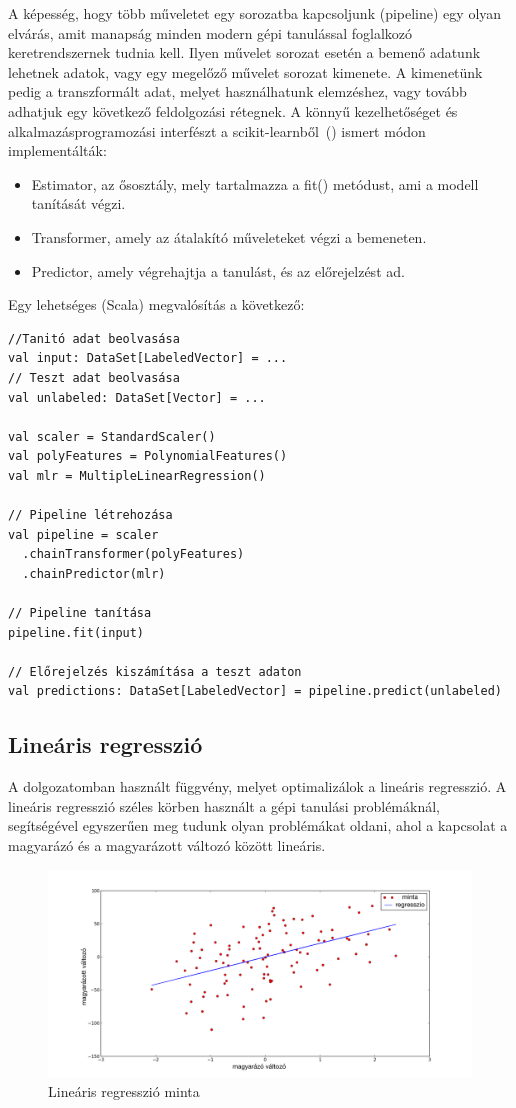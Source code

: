 \documentclass[a4paper,12pt]{article}
\begin{document}
A képesség, hogy több műveletet egy sorozatba kapcsoljunk (pipeline) egy olyan elvárás, amit manapság minden modern gépi tanulással foglalkozó keretrendszernek tudnia kell. Ilyen művelet sorozat esetén a bemenő adatunk lehetnek adatok, vagy egy megelőző művelet sorozat kimenete. A kimenetünk pedig a transzformált adat, melyet használhatunk elemzéshez, vagy tovább adhatjuk egy következő feldolgozási rétegnek.  A könnyű kezelhetőséget és alkalmazásprogramozási interfészt a scikit-learnből~(\cite{sciapi}) ismert módon implementálták: 
\begin{itemize}
\item Estimator, az ősosztály, mely tartalmazza a fit() metódust, ami a modell tanítását végzi.
\item Transformer, amely az átalakító műveleteket végzi a bemeneten.
\item Predictor, amely végrehajtja a tanulást, és az előrejelzést ad.
\end{itemize}

Egy lehetséges (Scala) megvalósítás a következő:

\begin{lstlisting}[style=Scala]
//Tanitó adat beolvasása
val input: DataSet[LabeledVector] = ...
// Teszt adat beolvasása
val unlabeled: DataSet[Vector] = ...

val scaler = StandardScaler()
val polyFeatures = PolynomialFeatures()
val mlr = MultipleLinearRegression()

// Pipeline létrehozása
val pipeline = scaler
  .chainTransformer(polyFeatures)
  .chainPredictor(mlr)

// Pipeline tanítása
pipeline.fit(input)

// Előrejelzés kiszámítása a teszt adaton
val predictions: DataSet[LabeledVector] = pipeline.predict(unlabeled)
\end{lstlisting}

\subsection{Lineáris regresszió}

A dolgozatomban használt függvény, melyet optimalizálok a lineáris regresszió. A lineáris regresszió széles körben használt a gépi tanulási problémáknál, segítségével egyszerűen meg tudunk olyan problémákat oldani, ahol a kapcsolat a magyarázó és a magyarázott változó között lineáris. 
\begin{figure}[H]
\centering
\includegraphics[width=130mm]{img/linreg.png}
\caption{Lineáris regresszió minta} \label{}
\end{figure}
\end{document}
